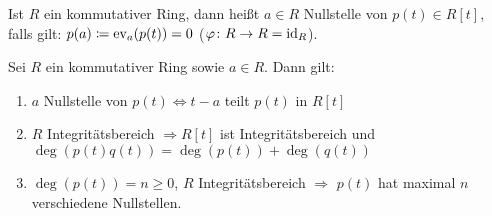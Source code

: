 \documentclass[12pt,a4paper]{scrartcl}
\begin{document}
\begin{defi}
	Ist $R$ ein kommutativer Ring, dann heißt $a\in R$ Nullstelle von $p(t) \in R[t]$, falls gilt: $p(a) \coloneqq \operatorname{ev}_a(p(t)) = 0$ ($\varphi\colon R\to R = \operatorname{id}_R$).
\end{defi}


\begin{satz}\label{thm:nullstelle_eigenschaft}
	Sei $R$ ein kommutativer Ring sowie $a\in R$. Dann gilt:
	\begin{enumerate}
		\item $a$ Nullstelle von $p(t) \Leftrightarrow t-a$ teilt $p(t)$ in $R[t]$
		\item $R$ Integritätsbereich $\Rightarrow R[t]$ ist Integritätsbereich und $\deg(p(t)q(t)) = \deg (p(t)) + \deg (q(t))$
		\item $\deg (p(t)) = n\geq 0$, $R$ Integritätsbereich $\Rightarrow$ $p(t)$ hat maximal $n$ verschiedene Nullstellen.
	\end{enumerate}
\end{satz}


\end{document}
